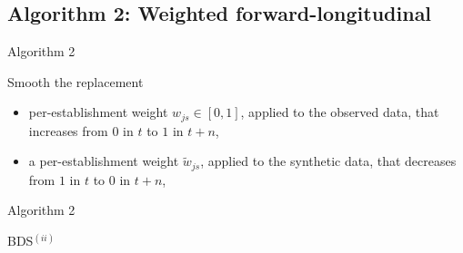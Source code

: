 \subsection{Algorithm 2: Weighted forward-longitudinal}

\begin{frame}{Algorithm 2}
\begin{block}{Smooth the replacement}
\begin{itemize}

\item per-establishment weight $w_{js} \in [0,1]$, applied to the observed data, that increases from 
$0$ in $t$ to $1$ in $t+n$, 
\item a per-establishment weight $\tilde{w}_{js}$, applied to the synthetic data, that decreases 
from $1$ in $t$ to $0$ in 
$t+n$, 
	
\end{itemize}
\end{block}
\end{frame}


\begin{frame}[fragile]{Algorithm 2}
	

	\begin{block}{BDS$^{(ii)}$}
		\begin{algorithm}
			\begin{algorithmic}
\EndIf
{}
			\end{algorithmic}
		\end{algorithm}
	\end{block}
\end{frame}

